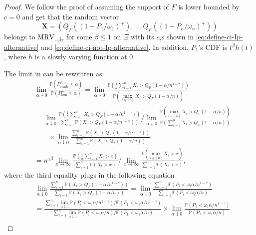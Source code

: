\documentclass[12pt]{article}
\theoremstyle{plain}
\theoremstyle{plain}
\theoremstyle{definition}
\renewcommand{\Pr}{\mathbb{P}}
\begin{document}
\begin{proof}
We follow the proof of  assuming the support of $F$ is lower bounded by $c=0$ and get that the random vector
\begin{equation*}
{\mathbf{X}} 
= \left( Q_{F}\left((1-P_1/\omega_1)^+\right),\dots, Q_{F}((1-P_n/\omega_n)^+)\right)
\end{equation*}
belongs to $\mathrm{MRV}_{-\beta\gamma}$ for some $\beta\le1$ on $\Xi$ with its $c_i$s shown in \eqref{eq:define-ci-Ip-alternative} and \eqref{eq:define-ci-not-Ip-alternative}. In addition, $P_1$'s CDF is $t^\beta h(t)$, where $h$ is a slowly varying function at 0. %



The limit in  can be rewritten as:
\begin{equation}
\label{eq:change-test-to-x-tilde}
\begin{split}
&\lim_{\alpha\downarrow0}\frac{\Pr\left(P_\mathrm{comb}^{F, \bm \omega}\le\alpha\right)}{\Pr\left(P_\mathrm{bon}^{\bm{\omega}}\le\alpha\right)}
=\lim_{\alpha\downarrow0}\frac{\Pr\left(\frac{1}{n}\sum_{i=1}^n X_i > Q_F\left(1-\alpha/n^{1-\gamma}\right)\right)}{\Pr(\max_{i\in[n]}X_i>Q_F(1-\alpha/n))}\\
&=\lim_{\alpha\downarrow0}\frac{\Pr\left(\frac{1}{n}\sum_{i=1}^n X_i > Q_F\left(1-\alpha/n^{1-\gamma}\right)\right)}{\sum_{i=1}^n\Pr(X_i>Q_F(1-\alpha/n^{1-\gamma}))}\bigg/\lim_{\alpha\downarrow0}\frac{\Pr(\max_{i\in[n]}X_i> Q_F(1-{\alpha}/{n}))}{\Pr\left(\sum_{i=1}^n X_i > Q_F(1-{\alpha}/{n})\right)}\\
&\qquad\times \lim_{\alpha\downarrow0}\frac{\sum_{i=1}^n\Pr(X_i> Q_F(1-{\alpha}/{n^{1-\gamma}}))}{\sum_{i=1}^n\Pr(X_i>Q_F(1-{\alpha}/{n}))}\\
&=n^{\gamma\beta}\lim_{x\to\infty}\frac{\Pr(\frac{1}{n}\sum_{i=1}^n X_i>x)}{\sum_{i=1}^n\Pr(X_i>x)}\bigg/\lim_{x\to\infty}\frac{\Pr(\max_{i\in[n]}X_i>x)}{\sum_{i=1}^n\Pr(X_i>x)},
\end{split}
\end{equation}
where the third equality plugs in the following equation
\begin{align*}
&\lim_{\alpha\downarrow0}\frac{\sum_{i=1}^n\Pr(X_i> Q_F(1-{\alpha}/{n^{1-\gamma}}))}{\sum_{i=1}^n\Pr(X_i>Q_F(1-{\alpha}/{n}))}
=\lim_{\alpha\downarrow0}\frac{\sum_{i=1}^n\Pr\left(P_i<\omega_i {\alpha}/{n^{1-\gamma}}\right)}{\sum_{i=1}^n\Pr\left(P_i<\omega_i{\alpha}/{n}\right)}\\
&=\frac{\sum_{i=1}^n\lim_{\alpha\downarrow0}\Pr\left(P_i<\omega_i {\alpha}/{n^{1-\gamma}}\right)/\Pr\left(P_1<\omega_1 {\alpha}/{n^{1-\gamma}}\right)}{\sum_{i=1}^n\lim_{\alpha\downarrow0}\Pr\left(P_i<\omega_i{\alpha}/{n}\right)/\Pr\left(P_1<\omega_1{\alpha}/{n}\right)}\times\lim_{\alpha\downarrow0}\frac{\Pr\left(P_1<\omega_1 {\alpha}/{n^{1-\gamma}}\right)}{\Pr\left(P_1<\omega_1{\alpha}/{n}\right)}\\

\end{align*}
\end{proof}
\end{document}
